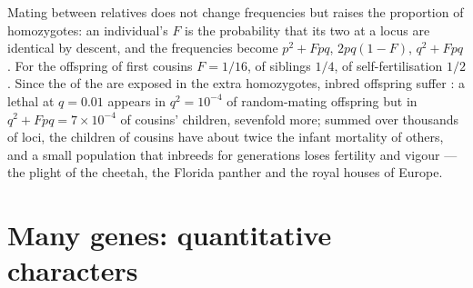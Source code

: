 \begin{proposition}[Inbreeding]\label{prop:b2:population-genetics:inbreeding}
Mating between relatives does not change  frequencies but
raises the proportion of homozygotes: an individual's
\emph{} $F$ is the probability that its two
 at a locus are identical by descent, and the 
frequencies become $p^{2} + Fpq$, $2pq(1 - F)$, $q^{2} + Fpq$. For
the offspring of first cousins $F = 1/16$, of siblings $1/4$, of
self-fertilisation $1/2$. Since the   of the  are exposed in the extra homozygotes, inbred offspring suffer
\emph{}: a lethal  at $q = 0.01$
appears in $q^{2} = 10^{-4}$ of random-mating offspring but in
$q^{2} + Fpq = 7\times 10^{-4}$ of cousins' children, sevenfold more;
summed over thousands of loci, the children of cousins have about
twice the infant mortality of others, and a small population that
inbreeds for generations loses fertility and vigour --- the plight
of the cheetah, the Florida panther and the royal houses of Europe.
\end{proposition}

\section{Many genes: quantitative characters}

